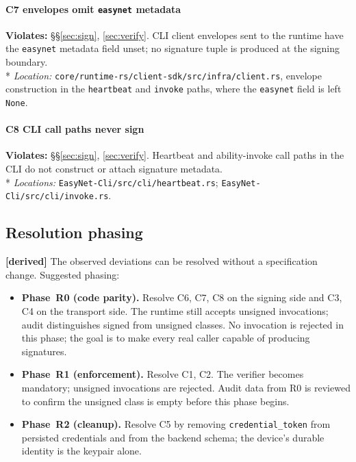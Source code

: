 \documentclass[11pt,a4paper]{article}
\newcommand{\derived}{\textcolor{derivedcolor}{\textbf{[derived]}}\xspace}
\begin{document}
\paragraph{C7 \textemdash{} envelopes omit \texttt{easynet} metadata}
\textbf{Violates:} \S\S\ref{sec:sign}, \ref{sec:verify}.
CLI client envelopes sent to the runtime have the \texttt{easynet}
metadata field unset; no signature tuple is produced at the signing
boundary.
\\*
\emph{Location:}
\texttt{core/runtime-rs/client-sdk/src/infra/client.rs}, envelope
construction in the \texttt{heartbeat} and \texttt{invoke} paths,
where the \texttt{easynet} field is left \texttt{None}.

\paragraph{C8 \textemdash{} CLI call paths never sign}
\textbf{Violates:} \S\S\ref{sec:sign}, \ref{sec:verify}.
Heartbeat and ability-invoke call paths in the CLI do not construct
or attach signature metadata.
\\*
\emph{Locations:} \texttt{EasyNet-Cli/src/cli/heartbeat.rs};
\texttt{EasyNet-Cli/src/cli/invoke.rs}.

\subsection{Resolution phasing}

\derived{} The observed deviations can be resolved without a
specification change. Suggested phasing:

\begin{itemize}[leftmargin=2em,itemsep=0.2em]
    \item \textbf{Phase~R0 (code parity).} Resolve C6, C7, C8 on the
    signing side and C3, C4 on the transport side. The runtime still
    accepts unsigned invocations; audit distinguishes signed from
    unsigned classes. No invocation is rejected in this phase; the
    goal is to make every real caller capable of producing signatures.
    \item \textbf{Phase~R1 (enforcement).} Resolve C1, C2. The
    verifier becomes mandatory; unsigned invocations are rejected.
    Audit data from R0 is reviewed to confirm the unsigned class is
    empty before this phase begins.
    \item \textbf{Phase~R2 (cleanup).} Resolve C5 by removing
    \texttt{credential\_token} from persisted credentials and from
    the backend schema; the device's durable identity is the keypair
    alone.
\end{itemize}
\end{document}
